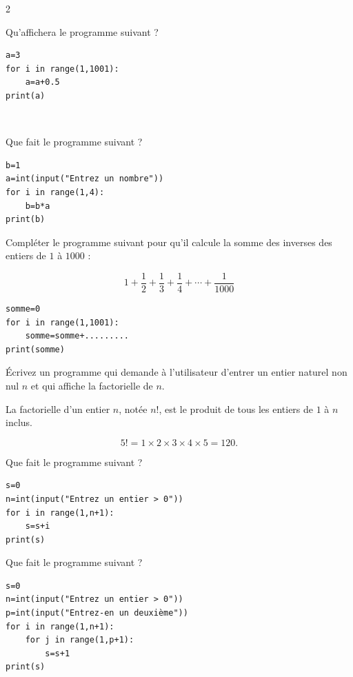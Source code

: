 {\begin{multicols}{2}
	  \begin{exo}{}
		  Qu'affichera le programme suivant ?

		  \begin{lstlisting}
a=3
for i in range(1,1001):
    a=a+0.5
print(a)
\end{lstlisting}
	  \end{exo}

	  \vfill~\columnbreak

	  \begin{exo}{}
		  Que fait le programme suivant ?

		  \begin{lstlisting}
b=1
a=int(input("Entrez un nombre"))
for i in range(1,4):
    b=b*a
print(b)
\end{lstlisting}
	  \end{exo}

	  \begin{exo}{}
		  Compléter le programme suivant pour qu'il calcule la somme des inverses des entiers de $1$ à $1000$ :

		  \[
			  1 + \frac12 + \frac13 + \frac14 + \cdots + \frac1{1000}
		  \]

		  \begin{lstlisting}
somme=0
for i in range(1,1001):
    somme=somme+.........
print(somme)
\end{lstlisting}
	  \end{exo}

	  \begin{exo}{}
		  Écrivez un programme qui demande à l'utilisateur d'entrer un entier naturel non nul $n$ et qui affiche la factorielle de $n$.

		  La factorielle d'un entier $n$, notée $n!$, est le produit de tous les entiers de $1$ à $n$ inclus.

		  \[
			  5! = 1 \times 2 \times 3 \times 4 \times 5 = 120.
		  \]
	  \end{exo}

	  \begin{exo}{}
		  Que fait le programme suivant ?
		  {\footnotesize
		  \begin{lstlisting}
s=0
n=int(input("Entrez un entier > 0"))
for i in range(1,n+1):
    s=s+i
print(s)
\end{lstlisting}
		  }
	  \end{exo}

	  \begin{exo}{}
		  Que fait le programme suivant ?
		  {\footnotesize
		  \begin{lstlisting}
s=0
n=int(input("Entrez un entier > 0"))
p=int(input("Entrez-en un deuxième"))
for i in range(1,n+1):
    for j in range(1,p+1):
        s=s+1
print(s)
\end{lstlisting}
		  }
	  \end{exo}


\end{multicols}}
